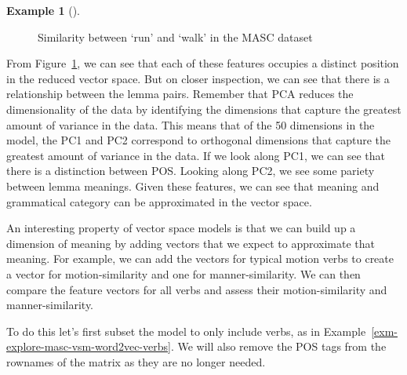 \documentclass[
  letterpaper,
]{latex/krantz}
\theoremstyle{definition}
\newtheorem{example}{Example}[chapter]
\theoremstyle{remark}
\begin{document}
\begin{example}[]
\begin{figure}[!htb]
{}

\caption{\label{fig-explore-masc-vsm-word2vec-similarity}Similarity
between `run' and `walk' in the MASC dataset}

\end{figure}%

\end{example}

From Figure~\ref{fig-explore-masc-vsm-word2vec-similarity}, we can see
that each of these features occupies a distinct position in the reduced
vector space. But on closer inspection, we can see that there is a
relationship between the lemma pairs. Remember that PCA reduces the
dimensionality of the data by identifying the dimensions that capture
the greatest amount of variance in the data. This means that of the 50
dimensions in the model, the PC1 and PC2 correspond to orthogonal
dimensions that capture the greatest amount of variance in the data. If
we look along PC1, we can see that there is a distinction between POS.
Looking along PC2, we see some pariety between lemma meanings. Given
these features, we can see that meaning and grammatical category can be
approximated in the vector space.

An interesting property of vector space models is that we can build up a
dimension of meaning by adding vectors that we expect to approximate
that meaning. For example, we can add the vectors for typical motion
verbs to create a vector for motion-similarity and one for
manner-similarity. We can then compare the feature vectors for all verbs
and assess their motion-similarity and manner-similarity.

To do this let's first subset the model to only include verbs, as in
Example~\ref{exm-explore-masc-vsm-word2vec-verbs}. We will also remove
the POS tags from the rownames of the matrix as they are no longer
needed.
\end{document}
